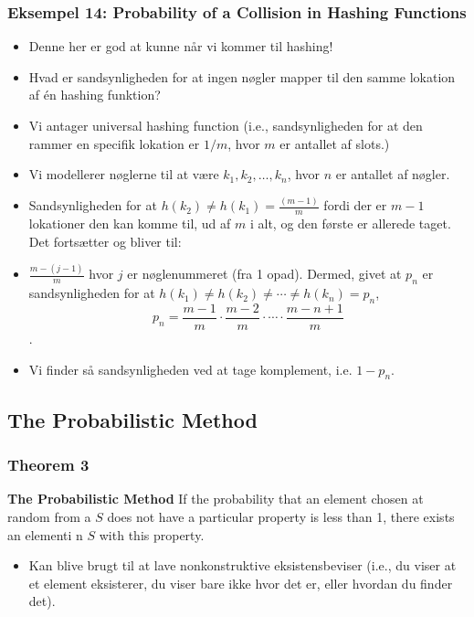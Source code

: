 \documentclass{beamer}
\begin{document}
\begin{frame}[allowframebreaks]
  \frametitle{Eksempel 14: Probability of a Collision in Hashing Functions}
  \begin{itemize}
  \item Denne her er god at kunne når vi kommer til hashing!
  \item Hvad er sandsynligheden for at ingen nøgler mapper til den samme lokation af én hashing funktion?
  \item Vi antager universal hashing function (i.e., sandsynligheden for at den rammer en specifik lokation er $1/m$, hvor $m$ er antallet af slots.)
  \item Vi modellerer nøglerne til at være $k_{1}, k_{2}, \ldots, k_{n}$, hvor $n$ er antallet af nøgler.
  \item Sandsynligheden for at $h(k_{2}) \neq h(k_{1}) = \frac{(m-1)}{m}$ fordi der er $m-1$ lokationer den kan komme til, ud af $m$ i alt, og den første er allerede taget. Det fortsætter og bliver til:
  \item $\frac{m-(j-1)}{m}$ hvor $j$ er nøglenummeret (fra 1 opad). Dermed, givet at $p_{n}$ er sandsynligheden for at $h(k_{1}) \neq h(k_{2}) \neq \cdots \neq h(k_{n}) = p_{n}$, \[p_{n}= \frac{m-1}{m} \cdot \frac{m-2}{m } \cdot \cdots \cdot \frac{m-n+1}{m} \]. 
  \item Vi finder så sandsynligheden ved at tage komplement, i.e. $1 - p_{n}$.
  \end{itemize}
\end{frame}

\subsection{The Probabilistic Method}
\label{subsec:probabilistic-method}

\begin{frame}
  \frametitle{Theorem 3}
  \begin{theorem}[Theorem 3]
    \textbf{The Probabilistic Method} If the probability that an element chosen at random from a $S$ does not have a particular property is less than 1, there exists an elementi n $S$ with this property.
  \end{theorem}
  \begin{itemize}
  \item Kan blive brugt til at lave nonkonstruktive eksistensbeviser (i.e., du viser at et element eksisterer, du viser bare ikke hvor det er, eller hvordan du finder det).
  \end{itemize}
\end{frame}
\end{document}
